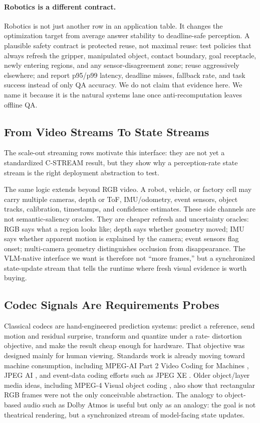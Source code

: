 \paragraph{Robotics is a different contract.}
Robotics is not just another row in an application table. It changes the
optimization target from average answer stability to deadline-safe perception.
A plausible safety contract is protected reuse, not maximal reuse: test
policies that always refresh the gripper, manipulated object, contact boundary,
goal receptacle, newly entering regions, and any sensor-disagreement zone;
reuse aggressively elsewhere; and report p95/p99 latency, deadline misses,
fallback rate, and task success instead of only QA accuracy. We do not claim
that evidence here. We name it because it is the natural systems lane once
anti-recomputation leaves offline QA.

\subsection{From Video Streams To State Streams}

The scale-out streaming rows motivate this interface: they are not yet a
standardized C-STREAM result, but they show why a perception-rate state stream
is the right deployment abstraction to test.

The same logic extends beyond RGB video. A robot, vehicle, or factory cell may
carry multiple cameras, depth or ToF, IMU/odometry, event sensors, object
tracks, calibration, timestamps, and confidence estimates. These side channels
are not semantic-saliency oracles. They are cheaper refresh and uncertainty
oracles: RGB says what a region looks like; depth says whether geometry moved;
IMU says whether apparent motion is explained by the camera; event sensors
flag onset; multi-camera geometry distinguishes occlusion from disappearance.
The VLM-native interface we want is therefore not ``more frames,'' but a
synchronized state-update stream that tells the runtime where fresh visual
evidence is worth buying.

\subsection{Codec Signals Are Requirements Probes}

Classical codecs are hand-engineered prediction systems: predict a reference,
send motion and residual surprise, transform and quantize under a rate-
distortion objective, and make the result cheap enough for hardware. That
objective was designed mainly for human viewing. Standards work is already
moving toward machine consumption, including MPEG-AI Part 2 Video Coding for
Machines \cite{mpegvcm}, JPEG AI \cite{jpegai}, and event-data coding efforts
such as JPEG XE \cite{jpegxe}. Older object/layer media ideas, including
MPEG-4 Visual object coding \cite{mpeg4visual}, also show that rectangular RGB
frames were not the only conceivable abstraction. The analogy to object-based
audio such as Dolby Atmos \cite{dolbyatmos} is useful but only as an analogy:
the goal is not theatrical rendering, but a synchronized stream of
model-facing state updates.

